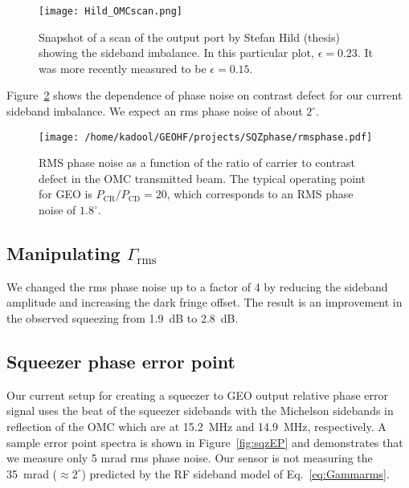 \documentclass{ligodoc}
\begin{document}
\begin{figure}
\begin{centering}
\texttt{[image: Hild\_OMCscan.png]}
\caption{Snapshot of a scan of the output port by Stefan Hild (thesis)
  showing the sideband imbalance. In this particular plot,
  $\epsilon=0.23$. It was more recently measured to be $\epsilon =
  0.15$.}
\label{fig:Hildscan}
\end{centering}
\end{figure}

Figure~\ref{fig:phirms} shows the dependence of phase noise on
contrast defect for our current sideband imbalance. We expect an rms
phase noise of about $2^\circ$.

\begin{figure}
\begin{centering}
\texttt{[image: /home/kadool/GEOHF/projects/SQZphase/rmsphase.pdf]}
\caption{RMS phase noise as a function of the ratio of carrier to
  contrast defect in the OMC transmitted beam. The typical operating
  point for GEO is $P_{\mathrm{CR}}/P_{\mathrm{CD}}=20$, which
  corresponds to an RMS phase noise of $1.8^\circ$.}
\label{fig:phirms}
\end{centering}
\end{figure}



\subsection{Manipulating $\Gamma_{\mathrm{rms}}$}
We changed the rms phase noise up to a factor of 4 by reducing the
sideband amplitude and increasing the dark fringe offset. The result
is an improvement in the observed squeezing from 1.9~dB to 2.8~dB.




\subsection{Squeezer phase error point}
Our current setup for creating a squeezer to GEO output relative phase
error signal uses the beat of the squeezer sidebands with the
Michelson sidebands in reflection of the OMC which are at 15.2~MHz and
14.9~MHz, respectively. A sample error point spectra is shown in
Figure~\ref{fig:sqzEP} and demonstrates that we measure only 5 mrad
rms phase noise. Our sensor is not measuring the 35~mrad ($\approx
2^\circ$) predicted by the RF sideband model of Eq.~\ref{eq:Gammarms}.
\end{document}
